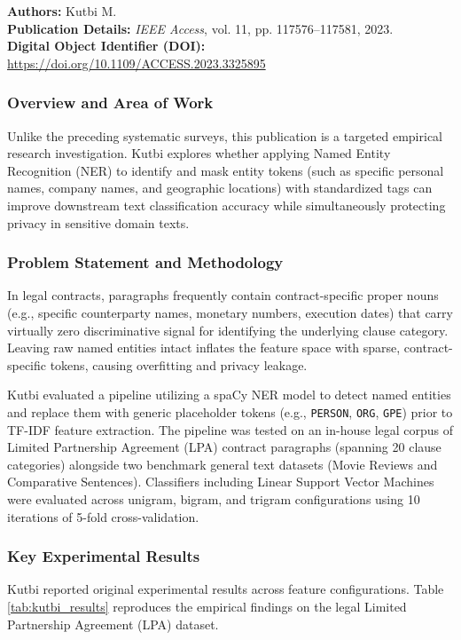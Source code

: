\noindent\textbf{Authors:} Kutbi M. \\
\textbf{Publication Details:} \textit{IEEE Access}, vol. 11, pp. 117576--117581, 2023. \\
\textbf{Digital Object Identifier (DOI):} \url{https://doi.org/10.1109/ACCESS.2023.3325895}

\subsubsection*{Overview and Area of Work}
Unlike the preceding systematic surveys, this publication is a targeted empirical research investigation. Kutbi explores whether applying Named Entity Recognition (NER) to identify and mask entity tokens (such as specific personal names, company names, and geographic locations) with standardized tags can improve downstream text classification accuracy while simultaneously protecting privacy in sensitive domain texts.

\subsubsection*{Problem Statement and Methodology}
In legal contracts, paragraphs frequently contain contract-specific proper nouns (e.g., specific counterparty names, monetary numbers, execution dates) that carry virtually zero discriminative signal for identifying the underlying clause category. Leaving raw named entities intact inflates the feature space with sparse, contract-specific tokens, causing overfitting and privacy leakage.

Kutbi evaluated a pipeline utilizing a spaCy NER model to detect named entities and replace them with generic placeholder tokens (e.g., \texttt{PERSON}, \texttt{ORG}, \texttt{GPE}) prior to TF-IDF feature extraction. The pipeline was tested on an in-house legal corpus of Limited Partnership Agreement (LPA) contract paragraphs (spanning 20 clause categories) alongside two benchmark general text datasets (Movie Reviews and Comparative Sentences). Classifiers including Linear Support Vector Machines were evaluated across unigram, bigram, and trigram configurations using 10 iterations of 5-fold cross-validation.

\subsubsection*{Key Experimental Results}
Kutbi reported original experimental results across feature configurations. Table \ref{tab:kutbi_results} reproduces the empirical findings on the legal Limited Partnership Agreement (LPA) dataset.

